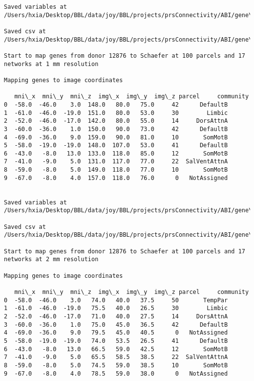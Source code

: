 \documentclass[11pt]{article}
\begin{document}
\begin{Verbatim}[commandchars=\\\{\}]
Saved variables at /Users/hxia/Desktop/BBL/data/joy/BBL/projects/prsConnectivity/ABI/gene\_mapping/12876donor\_100Parcels\_7Network\_2mm.pkl

Saved csv at /Users/hxia/Desktop/BBL/data/joy/BBL/projects/prsConnectivity/ABI/gene\_mapping/12876donor\_100Parcels\_7Network\_2mm.csv

Start to map genes from donor 12876 to Schaefer at 100 parcels and 17 networks at 1 mm resolution

Mapping genes to image coordinates

   mni\_x  mni\_y  mni\_z  img\_x  img\_y  img\_z parcel     community
0  -58.0  -46.0    3.0  148.0   80.0   75.0     42      DefaultB
1  -61.0  -46.0  -19.0  151.0   80.0   53.0     30        Limbic
2  -52.0  -46.0  -17.0  142.0   80.0   55.0     14     DorsAttnA
3  -60.0  -36.0    1.0  150.0   90.0   73.0     42      DefaultB
4  -69.0  -36.0    9.0  159.0   90.0   81.0     10       SomMotB
5  -58.0  -19.0  -19.0  148.0  107.0   53.0     41      DefaultB
6  -43.0   -8.0   13.0  133.0  118.0   85.0     12       SomMotB
7  -41.0   -9.0    5.0  131.0  117.0   77.0     22  SalVentAttnA
8  -59.0   -8.0    5.0  149.0  118.0   77.0     10       SomMotB
9  -67.0   -8.0    4.0  157.0  118.0   76.0      0   NotAssigned


Saved variables at /Users/hxia/Desktop/BBL/data/joy/BBL/projects/prsConnectivity/ABI/gene\_mapping/12876donor\_100Parcels\_17Network\_1mm.pkl

Saved csv at /Users/hxia/Desktop/BBL/data/joy/BBL/projects/prsConnectivity/ABI/gene\_mapping/12876donor\_100Parcels\_17Network\_1mm.csv

Start to map genes from donor 12876 to Schaefer at 100 parcels and 17 networks at 2 mm resolution

Mapping genes to image coordinates

   mni\_x  mni\_y  mni\_z  img\_x  img\_y  img\_z parcel     community
0  -58.0  -46.0    3.0   74.0   40.0   37.5     50       TempPar
1  -61.0  -46.0  -19.0   75.5   40.0   26.5     30        Limbic
2  -52.0  -46.0  -17.0   71.0   40.0   27.5     14     DorsAttnA
3  -60.0  -36.0    1.0   75.0   45.0   36.5     42      DefaultB
4  -69.0  -36.0    9.0   79.5   45.0   40.5      0   NotAssigned
5  -58.0  -19.0  -19.0   74.0   53.5   26.5     41      DefaultB
6  -43.0   -8.0   13.0   66.5   59.0   42.5     12       SomMotB
7  -41.0   -9.0    5.0   65.5   58.5   38.5     22  SalVentAttnA
8  -59.0   -8.0    5.0   74.5   59.0   38.5     10       SomMotB
9  -67.0   -8.0    4.0   78.5   59.0   38.0      0   NotAssigned



\end{Verbatim}
\end{document}
